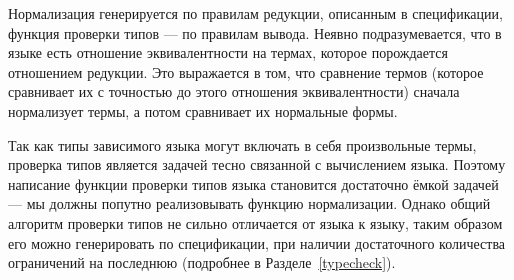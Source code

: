 Нормализация генерируется по правилам редукции, описанным в спецификации, функция проверки типов --- по правилам вывода. Неявно подразумевается, что в языке есть отношение эквивалентности на термах, которое порождается отношением редукции. Это выражается в том, что сравнение термов (которое сравнивает их с точностью до этого отношения эквивалентности) сначала нормализует термы, а потом сравнивает их нормальные формы.

Так как типы зависимого языка могут включать в себя произвольные термы, проверка типов является задачей тесно связанной с вычислением языка. Поэтому написание функции проверки типов языка становится достаточно ёмкой задачей --- мы должны попутно реализовывать функцию нормализации. Однако общий алгоритм проверки типов не сильно отличается от языка к языку, таким образом его можно генерировать по спецификации, при наличии достаточного количества ограничений на последнюю (подробнее в Разделе~\ref{typecheck}).






